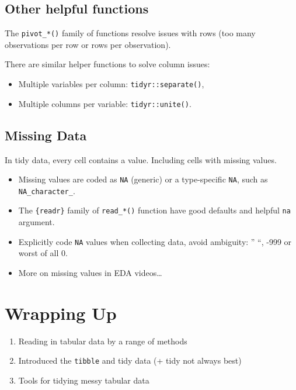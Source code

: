\documentclass[
  12pt,
]{book}
\begin{document}
\hypertarget{other-helpful-functions}{%
\subsection{Other helpful functions}\label{other-helpful-functions}}

The \texttt{pivot\_*()} family of functions resolve issues with rows (too many observations per row or rows per observation).

There are similar helper functions to solve column issues:

\begin{itemize}
\item
  Multiple variables per column: \texttt{tidyr::separate()},
\item
  Multiple columns per variable: \texttt{tidyr::unite()}.
\end{itemize}

\hypertarget{missing-data}{%
\subsection{Missing Data}\label{missing-data}}

In tidy data, every cell contains a value. Including cells with missing values.

\begin{itemize}
\item
  Missing values are coded as \texttt{NA} (generic) or a type-specific \texttt{NA}, such as \texttt{NA\_character\_}.
\item
  The \texttt{\{readr\}} family of \texttt{read\_*()} function have good defaults and helpful \texttt{na} argument.
\item
  Explicitly code \texttt{NA} values when collecting data, avoid ambiguity: '' ``, -999 or worst of all 0.
\item
  More on missing values in EDA videos\ldots{}
\end{itemize}

\hypertarget{wrapping-up-1}{%
\section{Wrapping Up}\label{wrapping-up-1}}

\begin{enumerate}
\def\labelenumi{\arabic{enumi}.}
\item
  Reading in tabular data by a range of methods
\item
  Introduced the \texttt{tibble} and tidy data (+ tidy not always best)
\item
  Tools for tidying messy tabular data
\end{enumerate}
\end{document}
